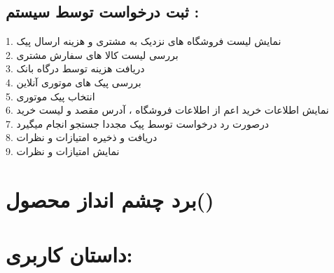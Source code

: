 \documentclass[12pt,onecolumn,a4paper]{article}
\begin{document}
\subsection{
ثبت درخواست توسط سیستم :
}
1.	نمایش لیست فروشگاه های نزدیک به مشتری و هزینه ارسال پیک\\
2.	بررسی لیست کالا های سفارش مشتری\\
3.	دریافت هزینه توسط درگاه بانک\\
4.	بررسی پیک های موتوری آنلاین\\
5.	انتخاب پیک موتوری\\
6.	نمایش اطلاعات خرید اعم از اطلاعات فروشگاه ، آدرس مقصد و لیست خرید\\
7.	درصورت رد درخواست توسط پیک مجددا جستجو انجام میگیرد\\
8.	دریافت و ذخیره امتیازات و نظرات\\
9.	نمایش امتیازات و نظرات\\

\newpage
\section{برد چشم انداز محصول\cite{3}()}
\begin{figure}[!h]
\caption{}\label{figpvb}
\end{figure}



\newpage

\section{داستان کاربری: } 
\end{document}
